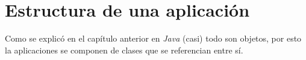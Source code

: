 \section{Estructura de una aplicación}
  Como se explicó en el capítulo anterior en \textit{Java} (casi) todo son objetos, por 
  esto la aplicaciones se componen de clases que se referencian entre sí.

  
%